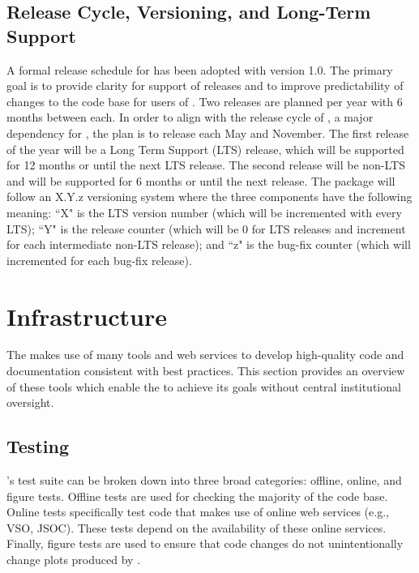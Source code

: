 \subsection{Release Cycle, Versioning, and Long-Term Support}
\label{sec:release}

A formal release schedule for \sunpypkg has been adopted with version 1.0.
The primary goal is to provide clarity for support of releases and to improve predictability of changes to the code base for users of \sunpypkg.
Two releases are planned per year with 6 months between each.
In order to align with the release cycle of \astropypkg, a major dependency for \sunpypkg, the plan is to release each May and November.
The first release of the year will be a Long Term Support (LTS) release, which will be supported for 12 months or until the next LTS release.
The second release will be non-LTS and will be supported for 6 months or until the next release.
The \sunpypkg package will follow an X.Y.z versioning system where the three components have the following meaning:
``X" is the LTS version number (which will be incremented with every LTS);
``Y" is the release counter (which will be 0 for LTS releases and increment for each intermediate non-LTS release);
and ``z" is the bug-fix counter (which will incremented for each bug-fix release).

\section{Infrastructure}
\label{sec:infrastructure}

The \sunpyproj makes use of many tools and web services to develop high-quality code and documentation consistent with best practices.
This section provides an overview of these tools which enable the \sunpyproj to achieve its goals without central institutional oversight.

\subsection{Testing}
\label{sec:continuous-integration}

\sunpypkg's test suite can be broken down into three broad categories: offline, online, and figure tests.
Offline tests are used for checking the majority of the code base.
Online tests specifically test code that makes use of online web services (e.g., VSO, JSOC).
These tests depend on the availability of these online services.
Finally, figure tests are used to ensure that code changes do not unintentionally change plots produced by \sunpypkg.

